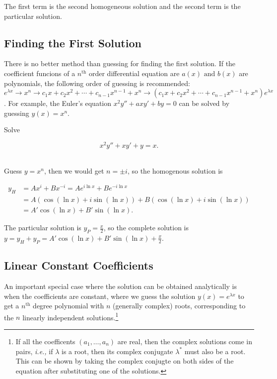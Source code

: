 \documentclass[english,a4paper,12pt]{report}
\begin{document}
The first term is the second homogeneous solution and the second term is the particular solution.


\subsection{Finding the First Solution}

There is no better method than guessing for finding the first solution. If the coefficient funcions of a \(n^{\text{th}} \) order differential equation are  \(a(x) \text { and } b(x)\) are polynomials, the following order of guessing is recommended: \(e^{\lambda x} \rightarrow x^{n} \rightarrow c_1 x + c_2 x^2+ \cdots + c_{n-1} x^{n-1} + x^{n} \rightarrow (c_1 x + c_2 x^2+ \cdots + c_{n-1} x^{n-1} + x^{n})e^{\lambda x}\). For example, the Euler's equation \(x^2y''+axy'+by=0\) can be solved by guessing \(y(x) = x^{n} \).  

{Solve

\begin{equation}
    x^2 y'' +xy' + y = x.
\end{equation}~
}
{Guess \(y = x^{n} \), then we would get \(n= \pm i\), so the homogenous solution is 

\begin{equation}
    \begin{aligned} 
    y_{H} &= Ax^{i}+Bx^{-i} = Ae^{i \ln x}+Be^{-i \ln x} \\ &= A(\cos (\ln x)+i \sin (\ln x))+B(\cos (\ln x)+i\sin (\ln x)) \\ &= A'\cos (\ln x)+B'\sin (\ln x).
    \end{aligned}      
\end{equation}

The particular solution is \(y_{P}= \frac{x}{2} \), so the complete solution is \(y = y_{H}+y_{P} = A'\cos (\ln x)+B'\sin (\ln x)+\frac{x}{2}    \).  




}

\subsection{Linear Constant Coefficients}

An important special case where the solution can be obtained analytically is when the coefficients are constant, where we guess the solution \(y(x) = e^{\lambda x} \) to get a \(n^{\text{th}} \) degree polynomial with \(n\) (generally complex) roots, corresponding to the \(n\) linearly independent solutions.\footnote{If all the coefficents \((a_1 ,\ldots ,a_{n} )\) are real, then the complex solutions come in pairs, \textit{i.e.,} if \(\lambda \) is a root, then its complex conjugate \(\lambda ^*\) must also be a root. This can be shown by taking the complex conjugte on both sides of the equation after substituting one of the solutions.}
\end{document}
